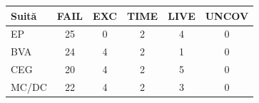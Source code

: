 \begin{center}
\begingroup\small
\begin{tabular}{@{}lccccc@{}}
\toprule
Suită & FAIL & EXC & TIME & LIVE & UNCOV \\
\midrule
EP & 25 & 0 & 2 & 4 & 0 \\
BVA & 24 & 4 & 2 & 1 & 0 \\
CEG & 20 & 4 & 2 & 5 & 0 \\
MC/DC & 22 & 4 & 2 & 3 & 0 \\
\bottomrule
\end{tabular}
\endgroup
\end{center}

